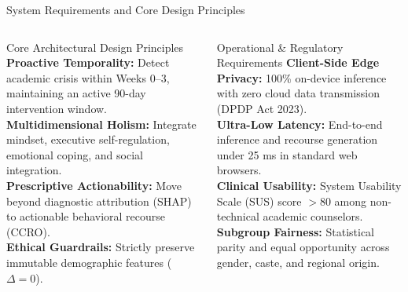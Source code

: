 \documentclass{beamer}
\begin{document}
\begin{frame}[t]{System Requirements and Core Design Principles}
  \begin{columns}[T]
    \begin{block}{\scriptsize Core Architectural Design Principles}
      \fontsize{5.2pt}{6.6pt}\selectfont
      \textbf{Proactive Temporality:} Detect academic crisis within Weeks 0--3, maintaining an active 90-day intervention window.\\[3pt]
      \textbf{Multidimensional Holism:} Integrate mindset, executive self-regulation, emotional coping, and social integration.\\[3pt]
      \textbf{Prescriptive Actionability:} Move beyond diagnostic attribution (SHAP) to actionable behavioral recourse (CCRO).\\[3pt]
      \textbf{Ethical Guardrails:} Strictly preserve immutable demographic features ($\Delta = 0$).
    \end{block}

    \begin{block}{\scriptsize Operational \& Regulatory Requirements}
      \fontsize{5.2pt}{6.6pt}\selectfont
      \textbf{Client-Side Edge Privacy:} 100\% on-device inference with zero cloud data transmission (DPDP Act 2023).\\[3pt]
      \textbf{Ultra-Low Latency:} End-to-end inference and recourse generation under 25 ms in standard web browsers.\\[3pt]
      \textbf{Clinical Usability:} System Usability Scale (SUS) score $> 80$ among non-technical academic counselors.\\[3pt]
      \textbf{Subgroup Fairness:} Statistical parity and equal opportunity across gender, caste, and regional origin.
    \end{block}
  \end{columns}
\end{frame}
\end{document}
